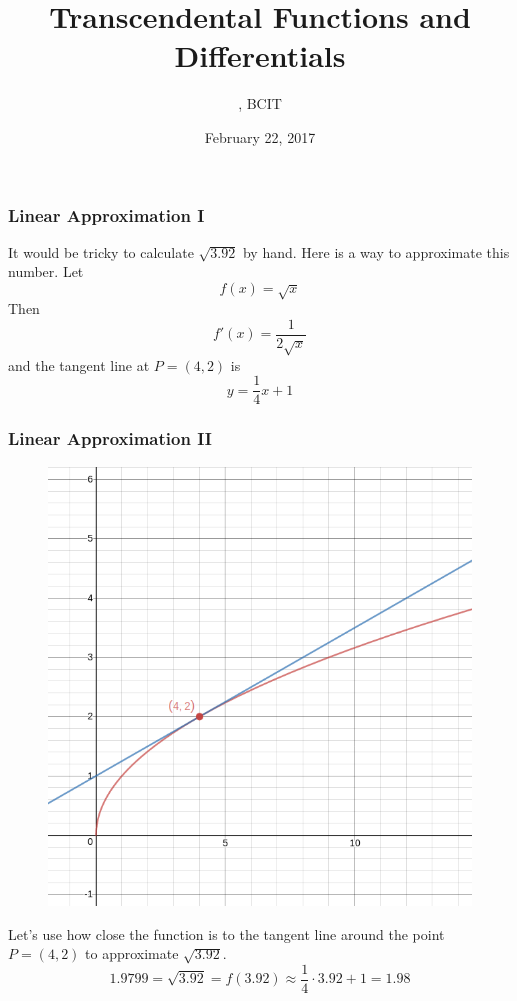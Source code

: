 \documentclass[xcolor=dvipsnames]{beamer}
\title{Transcendental Functions and Differentials}
\subtitle{{\CourseNumber}, BCIT}
\author{\CourseName}
\date{February 22, 2017}
\begin{document}
\begin{frame}
  \titlepage
\end{frame}

\begin{frame}
  \frametitle{Linear Approximation I}
It would be tricky to calculate $\sqrt{3.92}$ by hand. Here is a way
to approximate this number. Let
\begin{equation}
  \label{eq:eiyahqui}
  f(x)=\sqrt{x}
\end{equation}
Then 
\begin{equation}
  \label{eq:geimaimo}
  f'(x)=\frac{1}{2\sqrt{x}}
\end{equation}
and the tangent line at $P=(4,2)$ is
\begin{equation}
  \label{eq:oocahpoh}
y=\frac{1}{4}x+1  
\end{equation}
\end{frame}

\begin{frame}
  \frametitle{Linear Approximation II}
\begin{figure}[h]
\includegraphics[scale=.25]{./diagrams/linapp1.png}
\end{figure}
Let's use how close the function is to the tangent line around the point $P=(4,2)$ to approximate $\sqrt{3.92}$.
\begin{equation}
  \label{eq:chairaey}
  1.9799=\sqrt{3.92}=f(3.92)\approx{}\frac{1}{4}\cdot{}3.92+1=1.98
\end{equation}
\end{frame}
\end{document}
